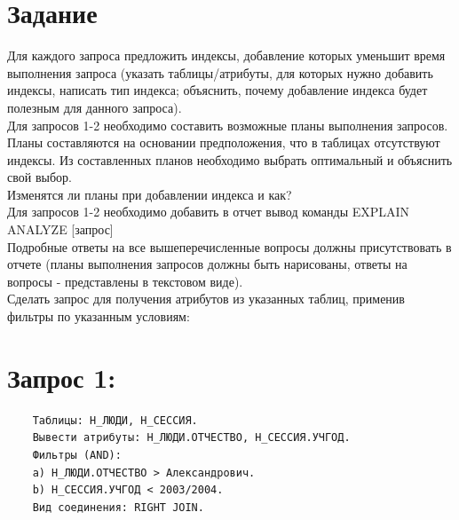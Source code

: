 
\vspace{3cm}
\tableofcontents

\newpage

\section{Задание}
Для каждого запроса предложить индексы, добавление которых уменьшит время выполнения запроса (указать таблицы/атрибуты, для которых нужно добавить индексы, написать тип индекса; объяснить, почему добавление индекса будет полезным для данного запроса).\\
Для запросов 1-2 необходимо составить возможные планы выполнения запросов. Планы составляются на основании предположения, что в таблицах отсутствуют индексы. Из составленных планов необходимо выбрать оптимальный и объяснить свой выбор.\\
Изменятся ли планы при добавлении индекса и как?\\
Для запросов 1-2 необходимо добавить в отчет вывод команды EXPLAIN ANALYZE [запрос]\\
Подробные ответы на все вышеперечисленные вопросы должны присутствовать в отчете (планы выполнения запросов должны быть нарисованы, ответы на вопросы - представлены в текстовом виде).\\

Сделать запрос для получения атрибутов из указанных таблиц, применив фильтры по указанным условиям:
\section{Запрос 1:}
\begin{verbatim}
    Таблицы: Н_ЛЮДИ, Н_СЕССИЯ.
    Вывести атрибуты: Н_ЛЮДИ.ОТЧЕСТВО, Н_СЕССИЯ.УЧГОД.
    Фильтры (AND):
    a) Н_ЛЮДИ.ОТЧЕСТВО > Александрович.
    b) Н_СЕССИЯ.УЧГОД < 2003/2004.
    Вид соединения: RIGHT JOIN.
\end{verbatim}

